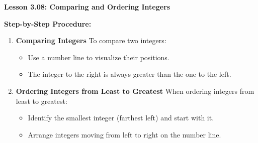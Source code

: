 \begin{center}
\textbf{Lesson 3.08: Comparing and Ordering Integers}
\end{center}

\vspace*{-1.5ex}

\noindent\textbf{Step-by-Step Procedure:}

\begin{enumerate}[noitemsep, label = \color{blue}\Alph*. ]
  
    \item \textbf{Comparing Integers} 
    To compare two integers:
    \begin{itemize}
        \item Use a number line to visualize their positions.
        \item The integer to the right is always greater than the one to the left.
  
    \end{itemize}
    
    \item \textbf{Ordering Integers from Least to Greatest} 
    When ordering integers from least to greatest:
    \begin{itemize}
        \item Identify the smallest integer (farthest left) and start with it.
        \item Arrange integers moving from left to right on the number line.
  
    \end{itemize}
   
\end{enumerate}


